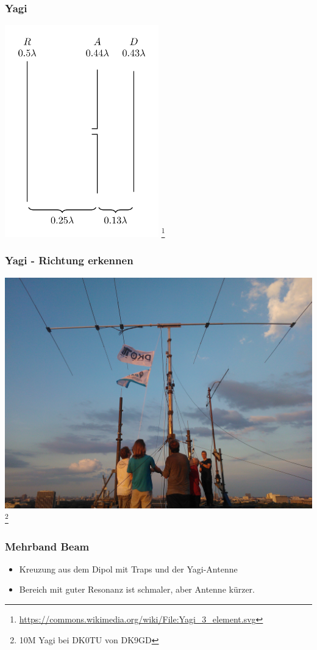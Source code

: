\begin{frame}
  \frametitle{Yagi}
  \begin{center}
    \includegraphics[width=0.5\textwidth]{a09/Yagi_3_element.png}
    \footnote{\tiny \url{https://commons.wikimedia.org/wiki/File:Yagi_3_element.svg}}
  \end{center}
\end{frame}

\begin{frame}
  \frametitle{Yagi - Richtung erkennen}
  \begin{center}
    \includegraphics[width=.9\textwidth]{a09/yagi.jpg}
    \footnote{\tiny 10M Yagi bei DK0TU von DK9GD}
  \end{center}
\end{frame}

\begin{frame}
  \frametitle{Mehrband Beam}
  \begin{center} \large
    \begin{itemize}
      \item Kreuzung aus dem Dipol mit Traps und der Yagi-Antenne
      \item Bereich mit guter Resonanz ist schmaler, aber Antenne kürzer.
    \end{itemize}
  \end{center}
\end{frame}

